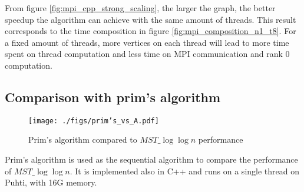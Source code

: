 \documentclass[english, 12pt, a4paper, elec, utf8, a-2b, online]{aaltothesis}
\newcommand{\mstalgo}{$MST\_\log\log{n}$}
\begin{document}
From figure \cref{fig:mpi_cpp_strong_scaling}, the larger the graph, the better speedup the algorithm can achieve with the same amount of threads. This result corresponds to the time composition in figure \cref{fig:mpi_composition_n1_t8}. For a fixed amount of threads, more vertices on each thread will lead to more time spent on thread computation and less time on MPI communication and rank 0 computation. 




\subsection{Comparison with prim's algorithm}
\begin{figure}[h]
	\centering
		\texttt{[image: ./figs/prim's\_vs\_A.pdf]}
	\caption{Prim's algorithm compared to \mstalgo{} performance}
	\label{fig:prims_vs_A}
\end{figure}
Prim's algorithm is used as the sequential algorithm to compare the performance of \mstalgo{}. It is implemented also in C++ and runs on a single thread on Puhti, with 16G memory.
\end{document}
